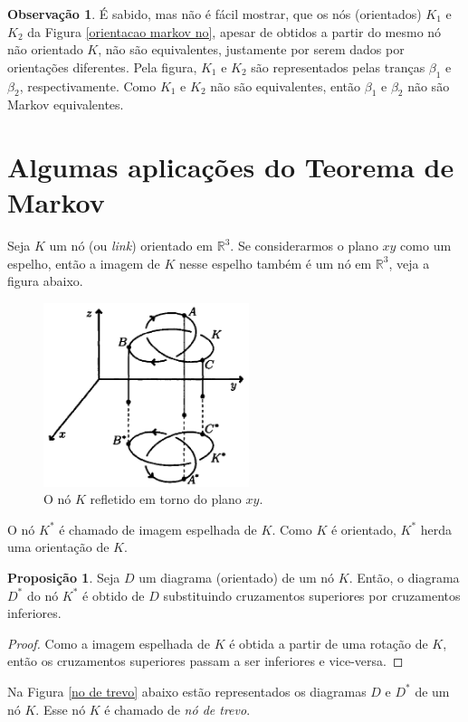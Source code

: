 \documentclass[a4paper,portuguese,11pt,twoside, leqno]{book}
\theoremstyle{definition}
\newtheorem{remark}{Observação}[section]
\newtheorem{prop}{Proposição}[section]
\begin{document}
\begin{remark}
		\par\vspace{0.3cm} É sabido, mas não é fácil mostrar, que os nós (orientados) $K_1$ e $K_2$ da Figura \eqref{orientacao markov no}, apesar de obtidos a partir do mesmo nó não orientado $K$, não são equivalentes, justamente por serem dados por orientações diferentes. Pela figura, $K_1$ e $K_2$ são representados pelas tranças $\beta_1$ e $\beta_2$, respectivamente. Como $K_1$ e $K_2$ não são equivalentes, então $\beta_1$ e $\beta_2$ não são Markov equivalentes.  
		
	\end{remark}
	\section{Algumas aplicações do Teorema de Markov}
	\hspace{12pt} Seja $K$ um nó (ou \textit{link}) orientado em $\mathbb{R}^3$. Se considerarmos o plano $xy$ como um espelho, então a imagem de $K$ nesse espelho também é um nó em $\mathbb{R}^3$, veja a figura abaixo.
	
	\begin{figure}[H]
		\begin{center}
			\includegraphics[width=6cm]{no_espelhado.png}
		\end{center}\caption{O nó $K$ refletido em torno do plano $xy$.}\label{no espelhado}
	\end{figure}
	\par\vspace{0.3cm} O nó $K^\ast$ é chamado de imagem espelhada de $K$. Como $K$ é orientado, $K^\ast$ herda uma orientação de $K$.
	\begin{prop}
		\label{troca de cruzamentos}
		Seja $D$ um diagrama (orientado) de um nó $K$. Então, o diagrama $D^\ast$ do nó $K^\ast$ é obtido de $D$ substituindo cruzamentos superiores por cruzamentos inferiores.	
	\end{prop}
	\begin{proof}
		Como a imagem espelhada de $K$ é obtida a partir de uma rotação de $K$, então os cruzamentos superiores passam a ser inferiores e vice-versa.
	\end{proof}
	\par\vspace{0.3cm} Na Figura \eqref{no de trevo} abaixo estão representados os diagramas $D$ e $D^\ast$ de um nó $K$. Esse nó $K$ é chamado de \textit{nó de trevo}.
	
\end{document}
